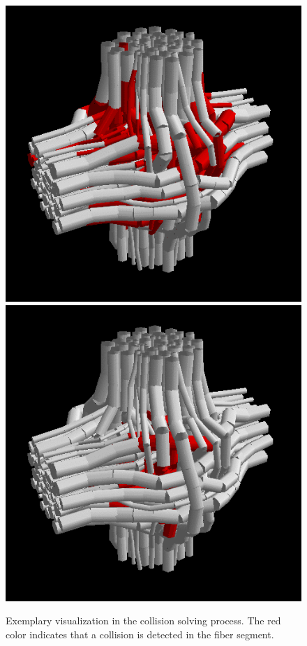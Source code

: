 \begin{figure}[!t]
    \includegraphics[width=\tikzwidth]{gfx/fastpli/solver-50}\hfill
    \includegraphics[width=\tikzwidth]{gfx/fastpli/solver-99}
	\caption{Exemplary visualization in the collision solving process. The red color indicates that a collision is detected in the fiber segment. }
	\label{fig:vis_solver}
\end{figure}
